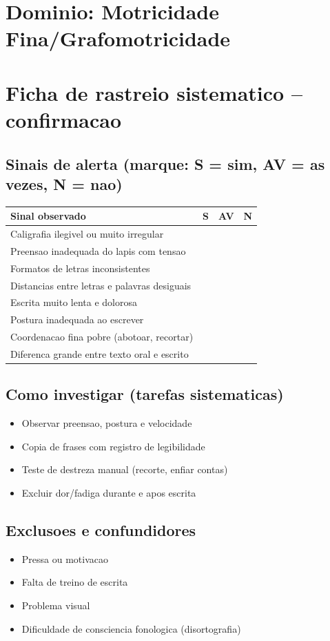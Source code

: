 \documentclass[a4paper,11pt]{book}
\begin{document}
\section*{Dominio: Motricidade Fina/Grafomotricidade}
\section*{Ficha de rastreio sistematico -- confirmacao}
\subsection*{Sinais de alerta (marque: S = sim, AV = as vezes, N = nao)}
\begin{tabular}{@{}p{11.5cm}ccc@{}}\toprule
Sinal observado & S & AV & N \\\midrule
Caligrafia ilegivel ou muito irregular & & & \\
Preensao inadequada do lapis com tensao & & & \\
Formatos de letras inconsistentes & & & \\
Distancias entre letras e palavras desiguais & & & \\
Escrita muito lenta e dolorosa & & & \\
Postura inadequada ao escrever & & & \\
Coordenacao fina pobre (abotoar, recortar) & & & \\
Diferenca grande entre texto oral e escrito & & & \\
\bottomrule\end{tabular}
\subsection*{Como investigar (tarefas sistematicas)}
\begin{itemize}
\item Observar preensao, postura e velocidade
\item Copia de frases com registro de legibilidade
\item Teste de destreza manual (recorte, enfiar contas)
\item Excluir dor/fadiga durante e apos escrita
\end{itemize}
\subsection*{Exclusoes e confundidores}
\begin{itemize}
\item Pressa ou motivacao
\item Falta de treino de escrita
\item Problema visual
\item Dificuldade de consciencia fonologica (disortografia)
\end{itemize}
\end{document}
